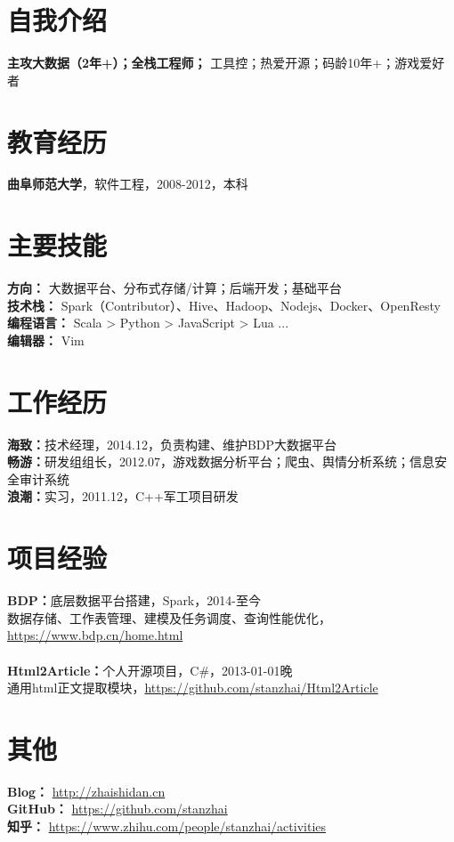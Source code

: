 \documentclass[UTF8,margin,line]{res}
\begin{document}

\begin{resume}

\section{\sc 自我介绍}
\textbf{主攻大数据（2年+）；全栈工程师；} 工具控；热爱开源；码龄10年+；游戏爱好者

\section{\sc 教育经历}
\textbf{曲阜师范大学}，软件工程，2008-2012，本科

\section{\sc 主要技能}
\textbf{方向：} 大数据平台、分布式存储/计算；后端开发；基础平台 \\
\textbf{技术栈：} Spark（Contributor）、Hive、Hadoop、Nodejs、Docker、OpenResty \\
\textbf{编程语言：} Scala > Python > JavaScript > Lua ... \\
\textbf{编辑器：} Vim

\section{\sc 工作经历}
\textbf{海致：}技术经理，2014.12，负责构建、维护BDP大数据平台 \\
\textbf{畅游：}研发组组长，2012.07，游戏数据分析平台；爬虫、舆情分析系统；信息安全审计系统 \\
\textbf{浪潮：}实习，2011.12，C++军工项目研发

\section{\sc 项目经验}
\textbf{BDP：}底层数据平台搭建，Spark，2014-至今 \\
数据存储、工作表管理、建模及任务调度、查询性能优化， \url{https://www.bdp.cn/home.html} \\
\\
\textbf{Html2Article：}个人开源项目，C\#，2013-01-01晚 \\
通用html正文提取模块，\url{https://github.com/stanzhai/Html2Article} \\

\section{\sc 其他}
\textbf{Blog：} \url{http://zhaishidan.cn} \\
\textbf{GitHub：} \url{https://github.com/stanzhai} \\
\textbf{知乎：} \url{https://www.zhihu.com/people/stanzhai/activities} \\

\end{resume}
\end{document}
